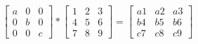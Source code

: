 \documentclass[12 pt]{slides}
\begin{document}
\begingroup
\[\begin{bmatrix}a & 0 & 0\\0 & b & 0\\0 & 0 & c\end{bmatrix} * \begin{bmatrix}1 & 2 & 3\\4 & 5 & 6\\7 & 8 & 9\end{bmatrix} =
  \begin{bmatrix}a1 & a2 & a3\\b4 & b5 & b6\\c7 & c8 & c9\end{bmatrix}\]
\endgroup
\end{document}
